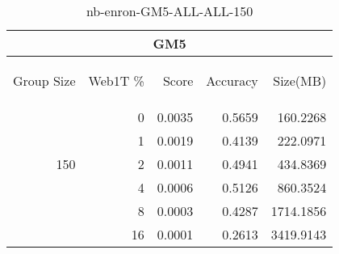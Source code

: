 \begin{center}
\begin{table}[htbp]
\begin{tabular}{ | r | r | r | r | r |}
\hline
\multicolumn{5}{|c|}{GM5}\\
\hline
\begin{sideways}Group Size\end{sideways} & \begin{sideways}Web1T \%\end{sideways} & \begin{sideways}Score\end{sideways} & \begin{sideways}Accuracy\end{sideways} & \begin{sideways}Size(MB)\end{sideways}\\
\hline
\multirow{5}{*}{150}
 & 0 & 0.0035 & 0.5659 & 160.2268\\ \cline{2-5}
 & 1 & 0.0019 & 0.4139 & 222.0971\\ \cline{2-5}
 & 2 & 0.0011 & 0.4941 & 434.8369\\ \cline{2-5}
 & 4 & 0.0006 & 0.5126 & 860.3524\\ \cline{2-5}
 & 8 & 0.0003 & 0.4287 & 1714.1856\\ \cline{2-5}
 & 16 & 0.0001 & 0.2613 & 3419.9143\\ \cline{2-5}
\hline
\end{tabular}
\caption{nb-enron-GM5-ALL-ALL-150}
\label{table:nb-enron-GM5-ALL-ALL-150}
\end{table}
\end{center}

